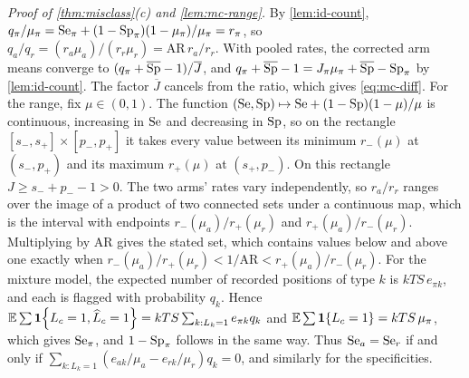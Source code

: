 \emph{Proof of \cref{thm:misclass}(c) and \cref{lem:mc-range}.} By \cref{lem:id-count}, $q_\pi/\mu_\pi=\mathrm{Se}_\pi+(1-\mathrm{Sp}_\pi)(1-\mu_\pi)/\mu_\pi=r_\pi$, so $q_a/q_r=(r_a\mu_a)/(r_r\mu_r)=\mathrm{AR}\,r_a/r_r$. With pooled rates, the corrected arm means converge to $(q_\pi+\overline{\mathrm{Sp}}-1)/\overline J$, and $q_\pi+\overline{\mathrm{Sp}}-1=J_\pi\mu_\pi+\overline{\mathrm{Sp}}-\mathrm{Sp}_\pi$ by \cref{lem:id-count}. The factor $\overline J$ cancels from the ratio, which gives \eqref{eq:mc-diff}. For the range, fix $\mu\in(0,1)$. The function $(\mathrm{Se},\mathrm{Sp})\mapsto\mathrm{Se}+(1-\mathrm{Sp})(1-\mu)/\mu$ is continuous, increasing in $\mathrm{Se}$ and decreasing in $\mathrm{Sp}$, so on the rectangle $[s_-,s_+]\times[p_-,p_+]$ it takes every value between its minimum $r_-(\mu)$ at $(s_-,p_+)$ and its maximum $r_+(\mu)$ at $(s_+,p_-)$. On this rectangle $J\ge s_-+p_--1>0$. The two arms' rates vary independently, so $r_a/r_r$ ranges over the image of a product of two connected sets under a continuous map, which is the interval with endpoints $r_-(\mu_a)/r_+(\mu_r)$ and $r_+(\mu_a)/r_-(\mu_r)$. Multiplying by $\mathrm{AR}$ gives the stated set, which contains values below and above one exactly when $r_-(\mu_a)/r_+(\mu_r)<1/\mathrm{AR}<r_+(\mu_a)/r_-(\mu_r)$. For the mixture model, the expected number of recorded positions of type $k$ is $kTS\,e_{\pi k}$, and each is flagged with probability $q_k$. Hence $\mathbb{E}\sum\mathbf{1}\!\left\{L_c=1,\widehat L_c=1\right\}=kTS\sum_{k:L_k=1}e_{\pi k}q_k$ and $\mathbb{E}\sum\mathbf{1}\!\left\{L_c=1\right\}=kTS\,\mu_\pi$, which gives $\mathrm{Se}_\pi$, and $1-\mathrm{Sp}_\pi$ follows in the same way. Thus $\mathrm{Se}_a=\mathrm{Se}_r$ if and only if $\sum_{k:L_k=1}(e_{ak}/\mu_a-e_{rk}/\mu_r)q_k=0$, and similarly for the specificities.

